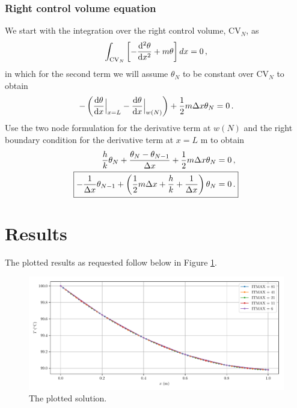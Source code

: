 \documentclass{article}
\begin{document}
\subsubsection*{Right control volume equation}

We start with the integration over the right control volume, CV$_N$, as
\[
	\int_{\text{CV}_N} \left[ -\dv{^2\theta}{x^2} + m \theta \right] dx = 0\,,
\]
in which for the second term we will assume $\theta_N$ to be constant over CV$_N$ to obtain
\[
	- \left( \dv{\theta}{x}\Big|_{x = L} - \dv{\theta}{x}\Big|_{w(N)} \right) + \frac{1}{2} m \Delta x \theta_N = 0\,.
\]
Use the two node formulation for the derivative term at $w(N)$ and the right boundary condition for the derivative term at $x = L$ m to obtain
\begin{align}
	\frac{h}{k} \theta_N + \frac{\theta_N - \theta_{N-1}}{\Delta x} + \frac{1}{2} m \Delta x \theta_N & = 0\,,\nonumber\\
	\Aboxed{- \frac{1}{\Delta x} \theta_{N-1} + \left(\frac{1}{2} m \Delta x + \frac{h}{k} + \frac{1}{\Delta x}\right) \theta_N & = 0\,.}
\end{align}

\section*{Results}

The plotted results as requested follow below in Figure \ref{fig:results}.

\begin{figure}[H]
	\centering
	\includegraphics[width=\linewidth]{../python/result}
	\caption{The plotted solution.}
	\label{fig:results}
\end{figure}
\end{document}
